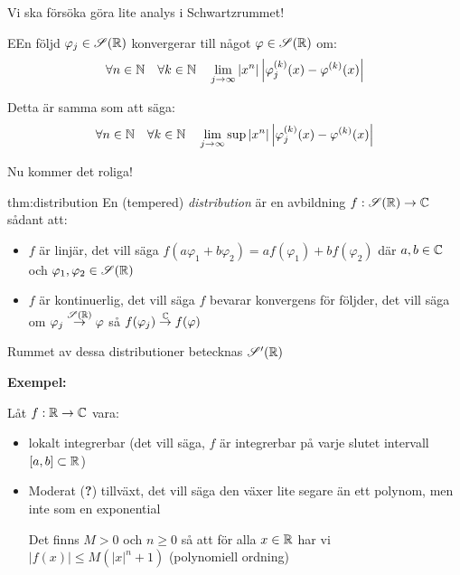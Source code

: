 \par\bigskip
\noindent Vi ska försöka göra lite analys i Schwartzrummet!
\par\bigskip
\begin{theo}
  EEn följd $\varphi_j\in\mathscr{S}(\mathbb{R})$ konvergerar till något $\varphi\in\mathscr{S}(\mathbb{R})$ om:
  \begin{equation*}
    \begin{gathered}
      \forall n\in\mathbb{N}\quad\forall k\in\mathbb{N}\quad\lim_{j\to\infty}\left|x^n\right|\left|\varphi_j^{(k)}(x)-\varphi^{(k)}(x)\right|
    \end{gathered}
  \end{equation*}\par
  \noindent Detta är samma som att säga:
  \begin{equation*}
    \begin{gathered}
      \forall n\in\mathbb{N}\quad\forall k\in\mathbb{N}\quad\lim_{j\to\infty}\sup{\left|x^n\right|\left|\varphi_j^{(k)}(x)-\varphi^{(k)}(x)\right|}
    \end{gathered}
  \end{equation*}
\end{theo}
\par\bigskip
\noindent Nu kommer det roliga!
\par\bigskip
\begin{theo}[Distribution]{thm:distribution}
  En (tempered) \textit{distribution }är en avbildning $f:\mathscr{S}(\mathbb{R})\to\mathbb{C}$ sådant att:\par
  \begin{itemize}
    \item $f$ är linjär, det vill säga $f(a\varphi_1+b\varphi_2) = af(\varphi_1)+bf(\varphi_2)$ där $a,b\in\mathbb{C}$ och $\varphi_1,\varphi_2\in\mathscr{S}(\mathbb{R})$
      \par\bigskip
    \item $f$ är kontinuerlig, det vill säga $f$ bevarar konvergens för följder, det vill säga om $\varphi_j\stackrel{\mathscr{S}(\mathbb{R})}{\to}\varphi$ så $f(\varphi_j)\stackrel{\mathbb{C}}{\to}f(\varphi)$
  \end{itemize}
  \par\bigskip
  \noindent Rummet av dessa distributioner betecknas $\mathscr{S}^{\prime}(\mathbb{R})$
\end{theo}
\par\bigskip
\noindent\textbf{Exempel:}\par
\noindent Låt $f:\mathbb{R}\to\mathbb{C}$ vara:\par
\begin{itemize}
  \item lokalt integrerbar (det vill säga, $f$ är integrerbar på varje slutet intervall $[a,b]\subset\mathbb{R}$)
    \par\bigskip
  \item Moderat (\textbf{?}) tillväxt, det vill säga den växer lite segare än ett polynom, men inte som en exponential\par
    \noindent Det finns $M>0$ och $n\geq0$ så att för alla $x\in\mathbb{R}$ har vi $\left|f(x)\right|\leq M(\left|x\right|^n+1)$ (polynomiell ordning)
\end{itemize}
